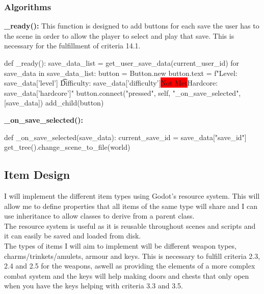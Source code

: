 \documentclass{article}
\newcommand{\red}[1]{\colorbox{red}{#1}}
\newcommand{\n}[0]{\red{Not Met}}
\begin{document}
        \subsubsection{Algorithms}
        \textbf{\_ready():}
        This function is designed to add buttons for each save the user has to the scene in order to allow the player to select and play that save. This is necessary for the fulfillment of criteria 14.1.\\
        \begin{python}
def _ready():
   save_data_list = get_user_save_data(current_user_id)
   for save_data in save_data_list:
      button = Button.new
      button.text = f"Level: {save_data['level']} \t Difficulty: {save_data['difficulty']}\n Hardcore: {save_data['hardcore']}"
      button.connect("pressed", self, "_on_save_selected", [save_data])
      add_child(button)
        \end{python}
        \textbf{\_on\_save\_selected():}
        \begin{python}
def _on_save_selected(save_data):
   current_save_id = save_data["save_id"]
   get_tree().change_scene_to_file(world)
        \end{python}
        \subsection{Item Design}
        I will implement the different item types using Godot's resource system. This will allow me to define properties that all items of the same type will share and I can use inheritance to allow classes to derive from a parent class.\\
        The resource system is useful as it is reusable throughout scenes and scripts and it can easily be saved and loaded from disk.\\
        The types of items I will aim to implement will be different weapon types, charms/trinkets/amulets, armour and keys. This is necessary to fulfill criteria 2.3, 2.4 and 2.5 for the weapons, aswell as providing the elements of a more complex combat system and the keys will help making doors and chests that only open when you have the keys helping with criteria 3.3 and 3.5.\\
\end{document}
